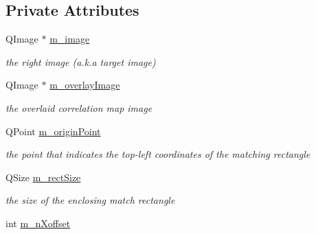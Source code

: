 \subsection*{Private Attributes}
\begin{DoxyCompactItemize}
\item 
\hypertarget{classTargetImgLabel_ae532d541556a3647cff5a83bcf1306c3}{
QImage $\ast$ \hyperlink{classTargetImgLabel_ae532d541556a3647cff5a83bcf1306c3}{m\_\-image}}
\label{classTargetImgLabel_ae532d541556a3647cff5a83bcf1306c3}

\begin{DoxyCompactList}\small\item\em the right image (a.k.a target image) \item\end{DoxyCompactList}\item 
\hypertarget{classTargetImgLabel_a94cf2b5841057d54bf3172aa2fef1e83}{
QImage $\ast$ \hyperlink{classTargetImgLabel_a94cf2b5841057d54bf3172aa2fef1e83}{m\_\-overlayImage}}
\label{classTargetImgLabel_a94cf2b5841057d54bf3172aa2fef1e83}

\begin{DoxyCompactList}\small\item\em the overlaid correlation map image \item\end{DoxyCompactList}\item 
\hypertarget{classTargetImgLabel_a0ed69ba29f03494cdd3ec22d9df4e15f}{
QPoint \hyperlink{classTargetImgLabel_a0ed69ba29f03494cdd3ec22d9df4e15f}{m\_\-originPoint}}
\label{classTargetImgLabel_a0ed69ba29f03494cdd3ec22d9df4e15f}

\begin{DoxyCompactList}\small\item\em the point that indicates the top-\/left coordinates of the matching rectangle \item\end{DoxyCompactList}\item 
\hypertarget{classTargetImgLabel_ae9e4109bdd7a8a6b5d0bd59850c6abba}{
QSize \hyperlink{classTargetImgLabel_ae9e4109bdd7a8a6b5d0bd59850c6abba}{m\_\-rectSize}}
\label{classTargetImgLabel_ae9e4109bdd7a8a6b5d0bd59850c6abba}

\begin{DoxyCompactList}\small\item\em the size of the enclosing match rectangle \item\end{DoxyCompactList}\item 
\hypertarget{classTargetImgLabel_a303d7686a3dd92560851dabe82425d89}{
int \hyperlink{classTargetImgLabel_a303d7686a3dd92560851dabe82425d89}{m\_\-nXoffset}}
\label{classTargetImgLabel_a303d7686a3dd92560851dabe82425d89}


\end{DoxyCompactItemize}
